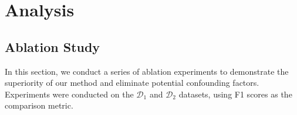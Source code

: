 \documentclass[11pt]{article}
\begin{document}






\section{Analysis}
\subsection{Ablation Study}
In this section, we conduct a series of ablation experiments to demonstrate the superiority of our method and eliminate potential confounding factors. Experiments were conducted on the $\mathcal{D}_1$ and $\mathcal{D}_2$ datasets, using F1 scores as the comparison metric.
\end{document}
